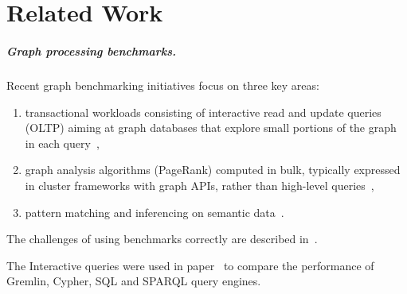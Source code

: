 \chapter{Related Work}
\label{section:related-work}


\paragraph*{Graph processing benchmarks.}

Recent graph benchmarking initiatives focus on three key areas:

\begin{enumerate}
\item transactional workloads consisting of interactive read and update queries (OLTP) aiming at graph databases that explore small portions of the graph in each query~\cite{DBLP:conf/cidr/BarahmandG13,DBLP:conf/sigmod/ArmstrongPBC13,DBLP:journals/ase/DayarathnaS14,DBLP:conf/sigmod/ErlingALCGPPB15,DBLP:journals/pvldb/LissandriniBV18},
\item graph analysis algorithms (\eg PageRank) computed in bulk, typically expressed in cluster frameworks with graph APIs, rather than high-level queries~\cite{DBLP:conf/hipc/BaderM05,DBLP:conf/bigdataconf/ElserM13,DBLP:conf/sc/NaiXTKL15,DBLP:journals/pvldb/IosupHNHPMCCSAT16},
\item pattern matching and inferencing on semantic data~\cite{DBLP:journals/ws/GuoPH05,DBLP:books/sp/virgilio09/SchmidtHMPL09,DBLP:conf/semweb/MorseyLAN11,DBLP:conf/semweb/AlucHOD14,DBLP:journals/sosym/SzarnyasIRV18}.
\end{enumerate}

The challenges of using benchmarks correctly are described in~\cite{DBLP:conf/sigmod/RaasveldtHGM18}.

The Interactive queries were used in paper~\cite{DBLP:conf/grades/PacaciZLO17} to compare the performance of Gremlin, Cypher, SQL and SPARQL query engines.


